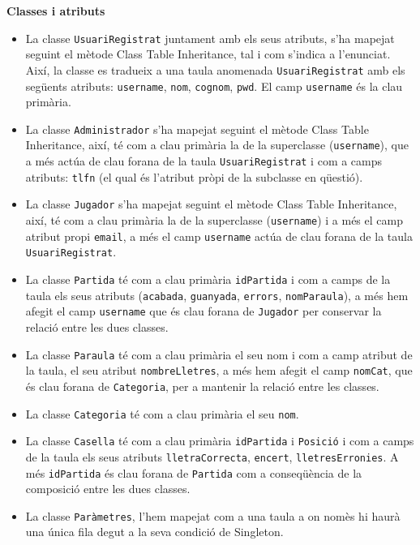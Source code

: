 \textbf{Classes i atributs}
\begin{itemize}
	\item La classe \texttt{UsuariRegistrat} juntament amb els seus atributs, s’ha mapejat seguint el mètode Class Table Inheritance, tal i com s’indica a l’enunciat. Així, la classe es tradueix a una taula anomenada \texttt{UsuariRegistrat} amb els següents atributs: \texttt{username}, \texttt{nom}, \texttt{cognom}, \texttt{pwd}. El camp \texttt{username} és la clau primària.
	
	\item La classe \texttt{Administrador} s’ha mapejat seguint el mètode Class Table Inheritance, així, té com a clau primària la de la superclasse (\texttt{username}), que a més actúa de clau forana de la taula \texttt{UsuariRegistrat} i com a camps atributs: \texttt{tlfn} (el qual és l’atribut pròpi de la subclasse en qüestió).
	
	\item La classe \texttt{Jugador} s’ha mapejat seguint el mètode Class Table Inheritance, així, té com a clau primària la de la superclasse (\texttt{username}) i a més el camp atribut propi \texttt{email}, a més el camp \texttt{username} actúa de clau forana de la taula \texttt{UsuariRegistrat}.
	
	\item La classe \texttt{Partida} té com a clau primària \texttt{idPartida} i com a camps de la taula els seus atributs (\texttt{acabada}, \texttt{guanyada}, \texttt{errors}, \texttt{nomParaula}), a més hem afegit el camp \texttt{username} que és clau forana de \texttt{Jugador} per conservar la relació entre les dues classes.
	
	\item La classe \texttt{Paraula} té com a clau primària el seu nom i com a camp atribut de la taula, el seu atribut \texttt{nombreLletres}, a més hem afegit el camp \texttt{nomCat}, que és clau forana de \texttt{Categoria}, per a mantenir la relació entre les classes.
	
	\item La classe \texttt{Categoria} té com a clau primària el seu \texttt{nom}.
	
	\item La classe \texttt{Casella} té com a clau primària \texttt{idPartida} i \texttt{Posició} i com a camps de la taula els seus atributs \texttt{lletraCorrecta}, \texttt{encert}, \texttt{lletresErronies}. A més \texttt{idPartida} és clau forana de \texttt{Partida} com a conseqüència de la composició entre les dues classes.
	
	\item La classe \texttt{Paràmetres}, l’hem mapejat com a una taula a on nomès hi haurà una única fila degut a la seva condició de Singleton.
\end{itemize}

